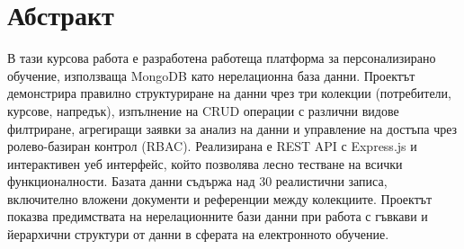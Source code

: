 \section*{Абстракт}

В тази курсова работа е разработена работеща платформа за персонализирано обучение, използваща MongoDB като нерелационна база данни. Проектът демонстрира правилно структуриране на данни чрез три колекции (потребители, курсове, напредък), изпълнение на CRUD операции с различни видове филтриране, агрегиращи заявки за анализ на данни и управление на достъпа чрез ролево-базиран контрол (RBAC). Реализирана е REST API с Express.js и интерактивен уеб интерфейс, който позволява лесно тестване на всички функционалности. Базата данни съдържа над 30 реалистични записа, включително вложени документи и референции между колекциите. Проектът показва предимствата на нерелационните бази данни при работа с гъвкави и йерархични структури от данни в сферата на електронното обучение.
